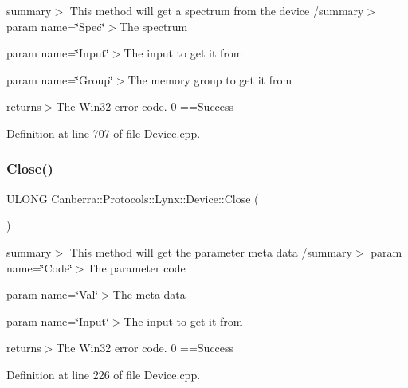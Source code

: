 summary$>$ This method will get a spectrum from the device /summary$>$ param name=\char`\"{}\+Spec\char`\"{}$>$The spectrum

param name=\char`\"{}\+Input\char`\"{}$>$The input to get it from

param name=\char`\"{}\+Group\char`\"{}$>$The memory group to get it from

returns$>$The Win32 error code. 0 ==Success

Definition at line 707 of file Device.\+cpp.

\mbox{\label{class_canberra_1_1_protocols_1_1_lynx_1_1_device_a0f7c10735473285afbc57765a673026e_a0f7c10735473285afbc57765a673026e}} 
\subsubsection{\texorpdfstring{Close()}{Close()}}
{\footnotesize\ttfamily U\+L\+O\+NG Canberra\+::\+Protocols\+::\+Lynx\+::\+Device\+::\+Close (\begin{DoxyParamCaption}{ }\end{DoxyParamCaption})}

summary$>$ This method will get the parameter meta data /summary$>$ param name=\char`\"{}\+Code\char`\"{}$>$The parameter code

param name=\char`\"{}\+Val\char`\"{}$>$The meta data

param name=\char`\"{}\+Input\char`\"{}$>$The input to get it from

returns$>$The Win32 error code. 0 ==Success

Definition at line 226 of file Device.\+cpp.

\mbox{\label{class_canberra_1_1_protocols_1_1_lynx_1_1_device_ab739d02cc29a9f569a2b127fcbc1f884_ab739d02cc29a9f569a2b127fcbc1f884}} 
